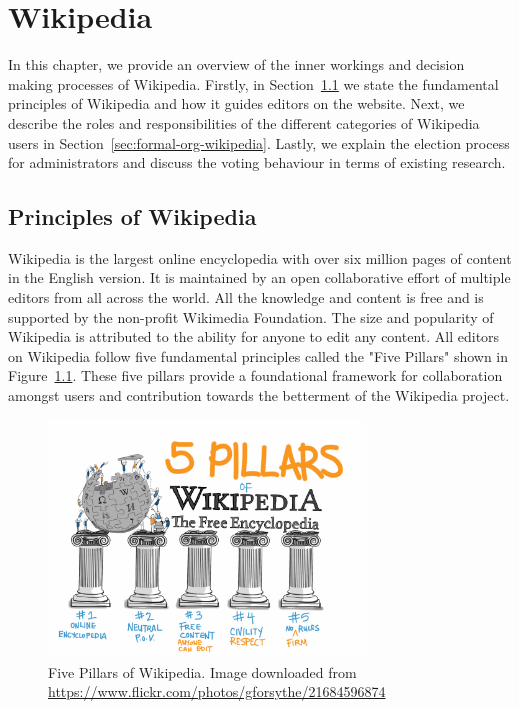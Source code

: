\chapter{Wikipedia}
\label{chp:wikipedia}
In this chapter, we provide an overview of the inner workings and decision making processes of Wikipedia. Firstly, in Section~\ref{sec:principles-wikipedia} we state the fundamental principles of Wikipedia and how it guides editors on the website. Next, we describe the roles and responsibilities of the  different categories of Wikipedia users in Section~\ref{sec:formal-org-wikipedia}. Lastly, we explain the election process for administrators and discuss the voting behaviour in terms of existing research. 

\section{Principles of Wikipedia}
\label{sec:principles-wikipedia}
Wikipedia is the largest online encyclopedia with over six million pages of content in the English version. It is maintained by an open collaborative effort of multiple editors from all across the world. All the knowledge and content is free and is supported by the non-profit Wikimedia Foundation. The size and popularity of Wikipedia is attributed to the ability for anyone to edit any content. All editors on Wikipedia follow five fundamental principles called the "Five Pillars" shown in Figure~\ref{fig:5-pillars}. 
These five pillars provide a foundational framework for collaboration amongst users and contribution towards the betterment of the Wikipedia project.  
\begin{figure}[!ht]
    \centering
    \includegraphics[width=0.75\textwidth]{images/Pillars.jpg}
    \caption{Five Pillars of Wikipedia. Image downloaded from \url{https://www.flickr.com/photos/gforsythe/21684596874}}
    \label{fig:5-pillars}   
\end{figure}

